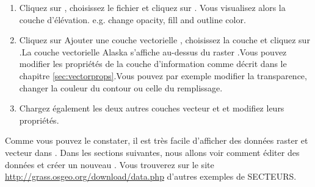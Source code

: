 \begin{enumerate}
  \item Cliquez sur , 
  choisissez le fichier  et cliquez sur . 
  Vous visualisez alors la couche d'élévation.
  e.g. change opacity, fill and outline color.
  \item Cliquez sur  {Ajouter une couche vectorielle \grass}, choisissez la couche  et cliquez sur .La couche vectorielle Alaska s'affiche au-dessus du raster .Vous pouvez modifier les propriétés de la couche d'information comme décrit dans le chapitre \ref{sec:vectorprops}.Vous pouvez par exemple modifier la transparence, changer la couleur du contour ou celle du remplissage.
  \item Chargez également les deux autres couches vecteur  et  et modifiez leurs propriétés.
\end{enumerate}

Comme vous pouvez le constater, il est très facile d'afficher des données \grass raster et vecteur dans \qg. 
Dans les sections suivantes, nous allons voir comment éditer des données \grass et créer un nouveau . 
Vous trouverez sur le site \grass \url{http://grass.osgeo.org/download/data.php} d'autres exemples de SECTEURS.

